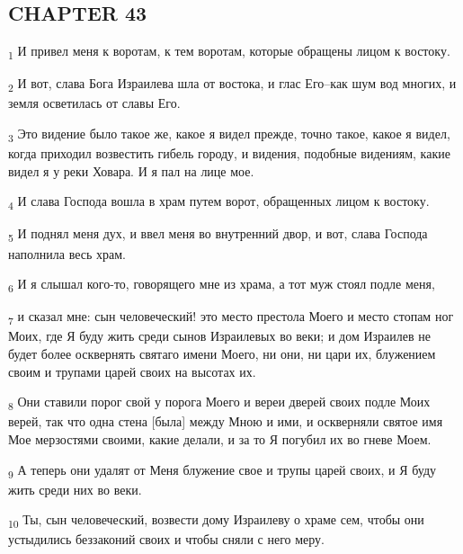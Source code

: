 \subsection{CHAPTER 43}
\begin{tcolorbox}
\textsubscript{1} И привел меня к воротам, к тем воротам, которые обращены лицом к востоку.
\end{tcolorbox}
\begin{tcolorbox}
\textsubscript{2} И вот, слава Бога Израилева шла от востока, и глас Его--как шум вод многих, и земля осветилась от славы Его.
\end{tcolorbox}
\begin{tcolorbox}
\textsubscript{3} Это видение было такое же, какое я видел прежде, точно такое, какое я видел, когда приходил возвестить гибель городу, и видения, подобные видениям, какие видел я у реки Ховара. И я пал на лице мое.
\end{tcolorbox}
\begin{tcolorbox}
\textsubscript{4} И слава Господа вошла в храм путем ворот, обращенных лицом к востоку.
\end{tcolorbox}
\begin{tcolorbox}
\textsubscript{5} И поднял меня дух, и ввел меня во внутренний двор, и вот, слава Господа наполнила весь храм.
\end{tcolorbox}
\begin{tcolorbox}
\textsubscript{6} И я слышал кого-то, говорящего мне из храма, а тот муж стоял подле меня,
\end{tcolorbox}
\begin{tcolorbox}
\textsubscript{7} и сказал мне: сын человеческий! это место престола Моего и место стопам ног Моих, где Я буду жить среди сынов Израилевых во веки; и дом Израилев не будет более осквернять святаго имени Моего, ни они, ни цари их, блужением своим и трупами царей своих на высотах их.
\end{tcolorbox}
\begin{tcolorbox}
\textsubscript{8} Они ставили порог свой у порога Моего и вереи дверей своих подле Моих верей, так что одна стена [была] между Мною и ими, и оскверняли святое имя Мое мерзостями своими, какие делали, и за то Я погубил их во гневе Моем.
\end{tcolorbox}
\begin{tcolorbox}
\textsubscript{9} А теперь они удалят от Меня блужение свое и трупы царей своих, и Я буду жить среди них во веки.
\end{tcolorbox}
\begin{tcolorbox}
\textsubscript{10} Ты, сын человеческий, возвести дому Израилеву о храме сем, чтобы они устыдились беззаконий своих и чтобы сняли с него меру.
\end{tcolorbox}
